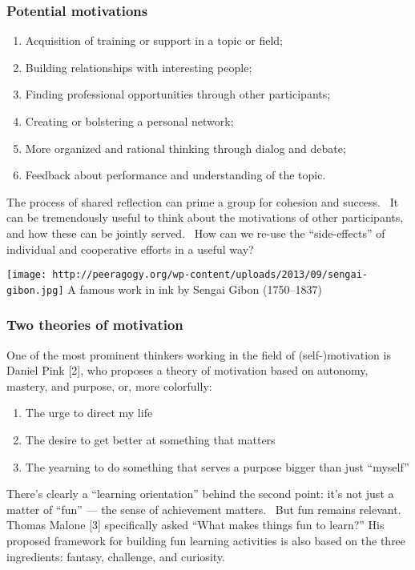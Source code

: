 \subsubsection{Potential motivations}

\begin{enumerate}
\itemsep1pt\parskip0pt
\item
  Acquisition of training or support in a topic or field;
\item
  Building relationships with interesting people;
\item
  Finding professional opportunities through other participants;
\item
  Creating or bolstering a personal network;
\item
  More organized and rational thinking through dialog and debate;
\item
  Feedback about performance and understanding of the topic.
\end{enumerate}

The process of shared reflection can prime a group for cohesion and
success.~ It can be tremendously useful to think about the motivations
of other participants, and how these can be jointly served.~ How can we
re-use the ``side-effects'' of individual and cooperative efforts in a
useful way?

\texttt{[image: http://peeragogy.org/wp-content/uploads/2013/09/sengai-gibon.jpg]}
A famous work in ink by Sengai Gibon (1750--1837)

\subsubsection{Two theories of motivation}

One of the most prominent thinkers working in the field of
\mbox{(self-)}motivation is Daniel Pink {[}2{]}, who proposes a theory of
motivation based on autonomy, mastery, and purpose, or, more colorfully:

\begin{enumerate}
\itemsep1pt\parskip0pt
\item
  The urge to direct my life
\item
  The desire to get better at something that matters
\item
  The yearning to do something that serves a purpose bigger than just
  ``myself''
\end{enumerate}

There's clearly a ``learning orientation'' behind the second point: it's
not just a matter of ``fun'' --- the sense of achievement matters.~ But
fun remains relevant. Thomas Malone {[}3{]} specifically asked ``What
makes things fun to learn?'' His proposed framework for building fun
learning activities is also based on the three ingredients: fantasy,
challenge, and curiosity.

